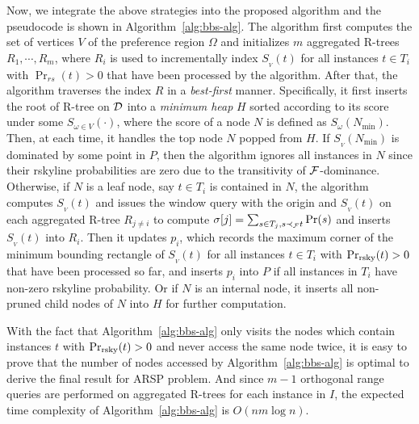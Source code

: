 Now, we integrate the above strategies into the proposed algorithm and the pseudocode is shown in Algorithm~\ref{alg:bbs-alg}.
The algorithm first computes the set of vertices $V$ of the preference region $\Omega$ and initializes $m$ aggregated R-trees $R_1, \cdots, R_m$, where $R_i$ is used to incrementally index $S_{_V}(t)$ for all instances $t \in T_i$ with $\Pr_{rs}(t) > 0$ that have been processed by the algorithm.
After that, the algorithm traverses the index $R$ in a \textit{best-first} manner.
Specifically, it first inserts the root of R-tree on $\mathcal{D}$ into a \textit{minimum heap} $H$ sorted according to its score under some $S_{\omega \in V}(\cdot)$, where the score of a node $N$ is defined as $S_\omega(N_{\min})$.
Then, at each time, it handles the top node $N$ popped from $H$.
If $S_{_V}(N_{\min})$ is dominated by some point in $P$, then the algorithm ignores all instances in $N$ since their rskyline probabilities are zero due to the transitivity of $\mathcal{F}$-dominance.
Otherwise, if $N$ is a leaf node, say $t \in T_i$ is contained in $N$, the algorithm computes $S_{_V}(t)$ and issues the window query with the origin and $S_{_V}(t)$ on each aggregated R-tree $R_{j \ne i}$ to compute $\sigma[j] = \sum_{s \in T_j, s \prec_{\mathcal{F}} t} \Pr(s)$ and inserts $S_{_V}(t)$ into $R_i$.
Then it updates $p_i$, which records the maximum corner of the minimum bounding rectangle of $S_{_V}(t)$ for all instances $t \in T_i$ with $\Pr_{\rm rsky}(t) > 0$ that have been processed so far, and inserts $p_i$ into $P$ if all instances in $T_i$ have non-zero rskyline probability.
Or if $N$ is an internal node, it inserts all non-pruned child nodes of $N$ into $H$ for further computation. 

With the fact that Algorithm~\ref{alg:bbs-alg} only visits the nodes which contain instances $t$ with $\Pr_{\rm rsky}(t) > 0$ and never access the same node twice, it is easy to prove that the number of nodes accessed by Algorithm~\ref{alg:bbs-alg} is optimal to derive the final result for ARSP problem.
And since $m-1$ orthogonal range queries are performed on aggregated R-trees for each instance in $I$, the expected time complexity of Algorithm~\ref{alg:bbs-alg} is $O(nm\log{n})$.


